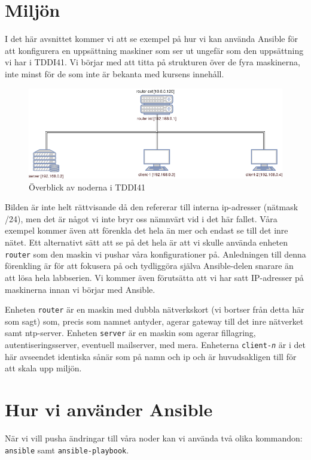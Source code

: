\section{Miljön}
I det här avsnittet kommer vi att se exempel på hur vi kan använda Ansible för att konfigurera en uppsättning maskiner som ser ut ungefär som den uppsättning vi har i TDDI41. Vi börjar med att titta på strukturen över de fyra maskinerna, inte minst för de som inte är bekanta med kursens innehåll.

\begin{figure}[H]
  \center
  \includegraphics[scale=0.55]{./bilder/tddi41-overview.png}
  \caption{Överblick av noderna i TDDI41}
\end{figure}

Bilden är inte helt rättvisande då den refererar till interna ip-adresser (nätmask /24), 
men det är något vi inte bryr oss nämnvärt vid i det här fallet. Våra exempel kommer även
att förenkla det hela än mer och endast se till det inre nätet. Ett alternativt sätt att
se på det hela är att vi skulle använda enheten \texttt{router} som den maskin vi pushar
våra konfigurationer på. Anledningen till denna förenkling är för att fokusera på och 
tydliggöra själva Ansible-delen snarare än att lösa hela labbserien.
Vi kommer även förutsätta att vi har satt IP-adresser på maskinerna innan vi börjar med Ansible.

Enheten \texttt{router} är en maskin med dubbla nätverkskort (vi bortser från detta här som sagt) som,
precis som namnet antyder, agerar gateway till det inre nätverket samt ntp-server.
Enheten \texttt{server} är en maskin som agerar fillagring, autentiseringsserver, eventuell mailserver, med mera.
Enheterna \texttt{client-\emph{n}} är i det här avseendet identiska sånär som på namn och ip och
är huvudsakligen till för att skala upp miljön.

\section{Hur vi använder Ansible}
När vi vill pusha ändringar till våra noder kan vi använda två olika kommandon: \texttt{ansible} samt \texttt{ansible-playbook}.

